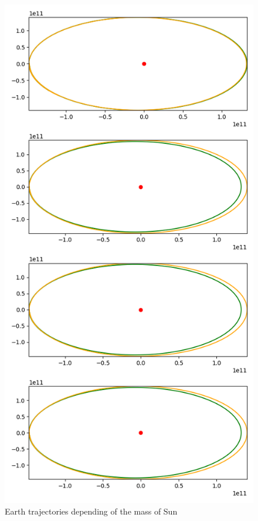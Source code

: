 \begin{figure}[H]
    \center
    \includegraphics[scale=.3]{img/sun_mass.png}
    \caption{Earth trajectories depending of the mass of Sun}
    \label{sun_mass_2}
\end{figure}

